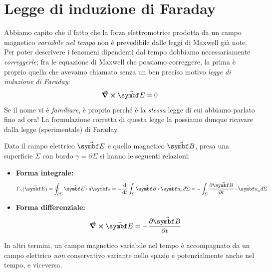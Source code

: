 \section{Legge di induzione di Faraday}
Abbiamo capito che il fatto che la forza elettromotrice prodotta da un campo magnetico \textit{variabile nel tempo} non è prevedibile dalle leggi di Maxwell già note. Per poter descrivere i fenomeni dipendenti dal tempo dobbiamo necessariamente \textit{correggerle}; fra le equazione di Maxwell che possiamo correggere, la prima è proprio quella che avevamo chiamato senza un ben preciso motivo \textit{legge di induzione di Faraday}:
\begin{equation*}
	\curl{\vba{E}}=0
\end{equation*}
Se il nome vi è \textit{familiare}, è proprio perché è la \textit{stessa} legge di cui abbiamo parlato fino ad ora! La formulazione corretta di questa legge la possiamo dunque ricavare dalla legge (sperimentale) di Faraday.
\begin{theorema}
	Dato il campo elettrico $\vba{E}$ e quello magnetico $\vba{B}$, presa una superficie $\Sigma$ con bordo $\gamma=\partial \Sigma$ si hanno le seguenti relazioni:
	\begin{itemize}
		\item \textbf{Forma integrale:}
		\begin{equation}
			\Gamma_{\gamma}(\vba{E})=\oint_{\partial \Sigma} \vba{E}\vdot d\vba{s}=-\dv{t}\int_{\Sigma}\vba{B}\vdot\vbh{u}_nd\Sigma=-\int_{\Sigma}\pdv{\vba{B}}{t}\vdot\vbh{u}_nd\Sigma\label{LeggeFaradayIntegrale}
		\end{equation}
		\item \textbf{Forma differenziale:}
		\begin{equation}
			\curl{\vba{E}}=-\pdv{\vba{B}}{t}\label{LeggeFaradayDifferenziale}
		\end{equation}
	\end{itemize}
	In altri termini, un campo magnetico variabile nel tempo è accompagnato da un campo elettrico \textit{non} conservativo variante nello spazio e potenzialmente anche nel tempo, e viceversa.
\end{theorema}
